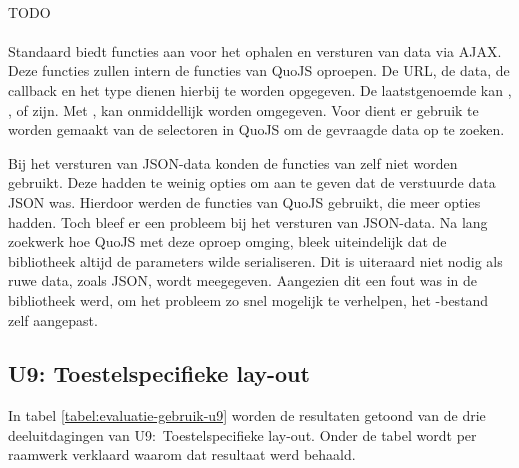 \paragraph{\kendo}
TODO

\paragraph{\lungo}
Standaard biedt \lungo{} functies aan voor het ophalen en versturen van data via AJAX.
Deze functies zullen intern de functies van QuoJS oproepen.
De URL, de data, de callback en het type dienen hierbij te worden opgegeven.
De laatstgenoemde kan , ,  of  zijn.
Met ,  kan onmiddellijk worden omgegeven.
Voor  dient er gebruik te worden gemaakt van de selectoren in QuoJS om de gevraagde data op te zoeken.

Bij het versturen van JSON-data konden de functies van \lungo{} zelf niet worden gebruikt.
Deze hadden te weinig opties om aan te geven dat de verstuurde data JSON was.
Hierdoor werden de functies van QuoJS gebruikt, die meer opties hadden.
Toch bleef er een probleem bij het versturen van JSON-data.
Na lang zoekwerk hoe QuoJS met deze oproep omging, bleek uiteindelijk dat de bibliotheek altijd de parameters wilde serialiseren.
Dit is uiteraard niet nodig als ruwe data, zoals JSON, wordt meegegeven.
Aangezien dit een fout was in de bibliotheek werd, om het probleem zo snel mogelijk te verhelpen, het \js-bestand zelf aangepast.

\subsection{U9: Toestelspecifieke lay-out}
\label{sec:evaluatie-gebruik-u9}
In tabel \ref{tabel:evaluatie-gebruik-u9} worden de resultaten getoond van de drie deeluitdagingen van U9:~Toestelspecifieke lay-out.
Onder de tabel wordt per raamwerk verklaard waarom dat resultaat werd behaald.

\begin{table}[H]
\centering
{}
\caption{Gebruik voor U9: Toestelspecifieke lay-out}
\label{tabel:evaluatie-gebruik-u9}
\end{table}

